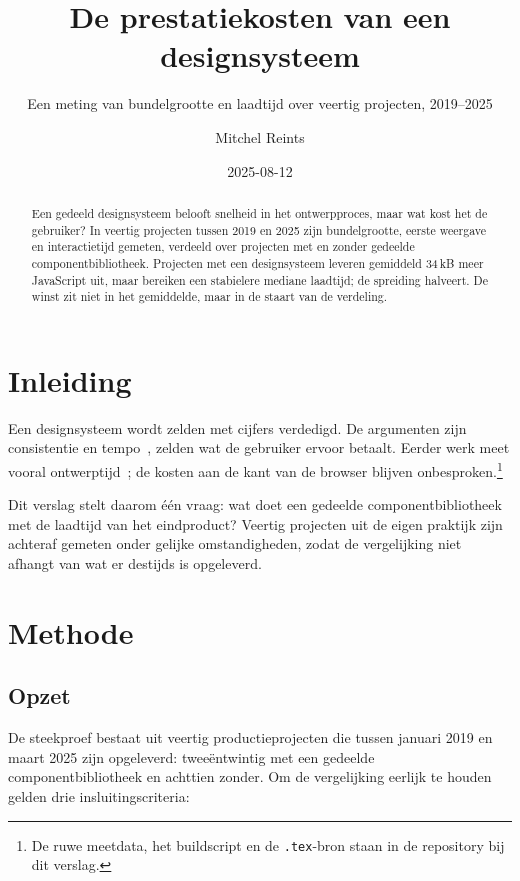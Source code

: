 \documentclass[11pt,a4paper]{article}
\title{De prestatiekosten van een designsysteem}
\subtitle{Een meting van bundelgrootte en laadtijd over veertig projecten, 2019--2025}
\author{Mitchel Reints}
\affiliation{Onafhankelijk onderzoek, Utrecht}
\date{2025-08-12}
\begin{document}
\maketitle

\begin{abstract}
Een gedeeld designsysteem belooft snelheid in het ontwerpproces, maar wat kost het de gebruiker? In veertig projecten tussen 2019 en 2025 zijn bundelgrootte, eerste weergave en interactietijd gemeten, verdeeld over projecten met en zonder gedeelde componentbibliotheek. Projecten met een designsysteem leveren gemiddeld 34\,kB meer JavaScript uit, maar bereiken een stabielere mediane laadtijd; de spreiding halveert. De winst zit niet in het gemiddelde, maar in de staart van de verdeling.
\end{abstract}

\section{Inleiding}
\label{sec:inleiding}

Een designsysteem wordt zelden met cijfers verdedigd. De argumenten zijn consistentie en tempo~\cite{frost16}, zelden wat de gebruiker ervoor betaalt. Eerder werk meet vooral ontwerptijd~\cite{curtis20,kholmatova17}; de kosten aan de kant van de browser blijven onbesproken.\footnote{De ruwe meetdata, het buildscript en de \texttt{.tex}-bron staan in de repository bij dit verslag.}

Dit verslag stelt daarom één vraag: wat doet een gedeelde componentbibliotheek met de laadtijd van het eindproduct? Veertig projecten uit de eigen praktijk zijn achteraf gemeten onder gelijke omstandigheden, zodat de vergelijking niet afhangt van wat er destijds is opgeleverd.

\clearpage

\section{Methode}
\label{sec:methode}

\subsection{Opzet}

De steekproef bestaat uit veertig productieprojecten die tussen januari 2019 en maart 2025 zijn opgeleverd: tweeëntwintig met een gedeelde componentbibliotheek en achttien zonder. Om de vergelijking eerlijk te houden gelden drie insluitingscriteria:
\end{document}
